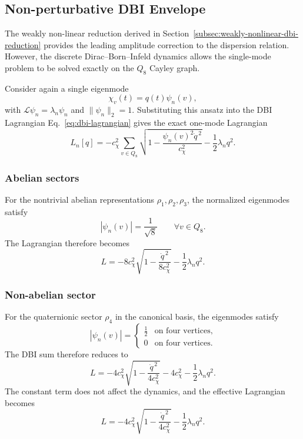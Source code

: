 \subsection{Non-perturbative DBI Envelope}
  \label{subsec:nonperturbative-dbi}

  The weakly non-linear reduction derived in
  Section~\ref{subsec:weakly-nonlinear-dbi-reduction} provides the leading
  amplitude correction to the dispersion relation.
  However, the discrete Dirac--Born--Infeld dynamics allows the
  single-mode problem to be solved exactly on the $Q_8$ Cayley graph.

  Consider again a single eigenmode
  \[
    \chi_v(t) = q(t)\psi_n(v),
  \]
  with $\mathcal{L}\psi_n = \lambda_n \psi_n$ and $\|\psi_n\|_2=1$.
  Substituting this ansatz into the DBI Lagrangian
  Eq.~\eqref{eq:dbi-lagrangian} gives the exact one-mode Lagrangian
  \begin{equation}
    L_n[q]
    =
    -c_\chi^2
    \sum_{v\in Q_8}
    \sqrt{1-\frac{\psi_n(v)^2\dot q^{\,2}}{c_\chi^2}}
    -
    \frac12\lambda_n q^2 .
  \end{equation}

  \subsubsection*{Abelian sectors}

    For the nontrivial abelian representations $\rho_1,\rho_2,\rho_3$,
    the normalized eigenmodes satisfy
    \[
      |\psi_n(v)| = \frac{1}{\sqrt{8}}
      \qquad
      \forall v\in Q_8 .
    \]
    The Lagrangian therefore becomes
    \begin{equation}
      L
      =
      -8c_\chi^2
      \sqrt{1-\frac{\dot q^{\,2}}{8c_\chi^2}}
      -
      \frac12\lambda_n q^2 .
    \end{equation}

  \subsubsection*{Non-abelian sector}

    For the quaternionic sector $\rho_4$ in the canonical basis,
    the eigenmodes satisfy
    \[
      |\psi_n(v)| =
      \begin{cases}
        \frac12 & \text{on four vertices}, \\
        0 & \text{on four vertices}.
      \end{cases}
    \]
    The DBI sum therefore reduces to
    \begin{equation}
      L
      =
      -4c_\chi^2
      \sqrt{1-\frac{\dot q^{\,2}}{4c_\chi^2}}
      -4c_\chi^2
      -
      \frac12\lambda_n q^2 .
    \end{equation}
    The constant term does not affect the dynamics, and the effective
    Lagrangian becomes
    \begin{equation}
      L
      =
      -4c_\chi^2
      \sqrt{1-\frac{\dot q^{\,2}}{4c_\chi^2}}
      -
      \frac12\lambda_n q^2 .
    \end{equation}

